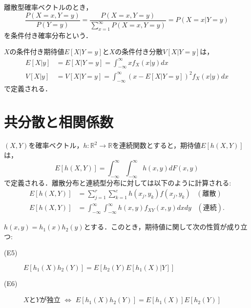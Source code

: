 \documentclass{jsreport}
\begin{document}
離散型確率ベクトルのとき，
\begin{equation}
  \frac{P(X = x, Y = y)}{P(Y = y)} = \frac{P(X = x, Y = y)}{\sum_{x = 1}^{\infty} P(X = x, Y = y)} = P(X = x | Y = y) \nonumber
\end{equation}
を条件付き確率分布という．

$X$の条件付き期待値$E[X | Y = y]$と$X$の条件付き分散$V[X | Y = y]$は，
\begin{align}
  E[X | y] &= E[X | Y = y] = \int_{-\infty}^{\infty} x f_{X} (x | y) dx \nonumber \\
  V[X | y] &= V[X | Y = y] = \int_{-\infty}^{\infty} (x - E[X | Y = y])^2 f_{X}(x | y) dx \nonumber
\end{align}
で定義される．

\section{共分散と相関係数}
$(X, Y)$を確率ベクトル，$h: \mathbb{R}^2 \rightarrow \mathbb{R}$を連続関数とすると，期待値$E[h(X, Y)]$は，
\begin{equation}
  E[h(X, Y)] = \int_{-\infty}^{\infty} \int_{-\infty}^{\infty} h(x, y) dF(x, y) \nonumber
\end{equation}
で定義される．離散分布と連続型分布に対しては以下のように計算される:
\begin{align}
  E[h(X, Y)] &= \sum_{j = 1}^r \sum_{k = 1}^c h(x_j, y_k) f(x_j, y_k) \; \; \; (離散) \nonumber \\
  E[h(X, Y)] &= \int_{-\infty}^{\infty} \int_{-\infty}^{\infty} h(x, y) f_{X Y}(x, y) dx dy \; \; \; (連続). \nonumber
\end{align}

$h(x, y) = h_1(x)h_2(y)$とする．このとき，期待値に関して次の性質が成り立つ:
\begin{description}
  \item[(E5)] $E[h_1(X)h_2(Y)] = E[h_2(Y)E[h_1(X)|Y]]$
  \item[(E6)] $X$と$Y$が独立 $\Longleftrightarrow$ $E[h_1(X)h_2(Y)] = E[h_1(X)]E[h_2(Y)]$
\end{description}
\end{document}
